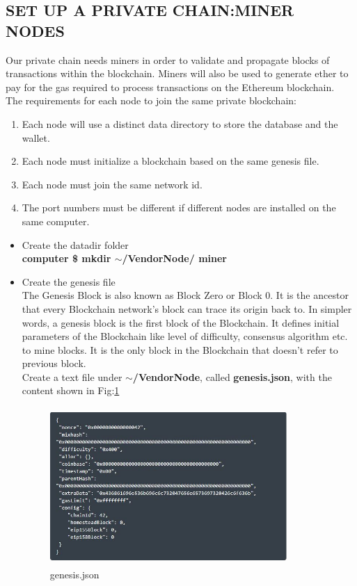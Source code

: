 \documentclass[journal,12pt,twocolumn]{IEEEtran}
\begin{document}
\subsection{SET UP A PRIVATE CHAIN:MINER NODES}
Our private chain needs miners in order to validate and propagate blocks of transactions within the blockchain. Miners will also be used to generate ether to pay for the gas required to process transactions on the Ethereum blockchain.\\
The requirements for each node to join the same private blockchain:
\begin{enumerate}

\item  Each node will use a distinct data directory to store the database and the wallet. 
\item  Each node must initialize a blockchain based on the same genesis file.
\item  Each node must join the same network id.
\item  The port numbers must be different if different nodes are installed on the same computer.\\

\end{enumerate}
\begin{itemize}
\item Create the datadir folder \\
      \textbf{ computer \$ mkdir $\sim$/VendorNode/				miner}\\
      
\item Create the genesis file \\
       The Genesis Block is also known as Block Zero or Block 0. It is the ancestor that every Blockchain network’s block can trace its origin back to. In simpler words, a genesis block is the first block of the Blockchain. It defines initial parameters of the Blockchain like level of difficulty, consensus algorithm etc. to mine blocks. It is the only block in the Blockchain that doesn’t refer to previous block.\\
       
Create a text file under \textbf{$\sim$/VendorNode}, called \textbf{genesis.json}, with the content shown in Fig:\ref{fig:1}\\


\begin{figure}
  \includegraphics[width=9cm, height=6cm]{genesis.JPG}
  \caption{genesis.json}
  \label{fig:1}
\end{figure}       
  \end{itemize}
  
\end{document}
